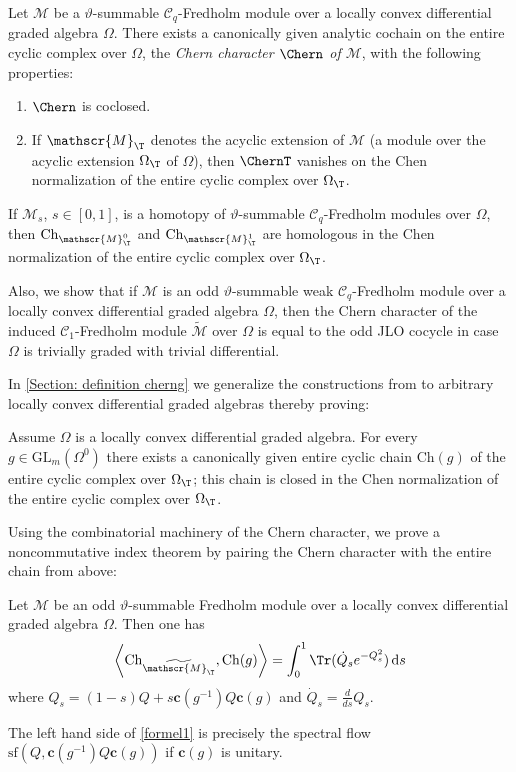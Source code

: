 \documentclass[a4paper, english, 12pt, bibliography=totocnumbered,
index=totoc]{scrartcl}
\begin{document}
\renewcommand*{\thethmALPH}{\Alph{thmALPH}}
\begin{thmALPH}
	Let $\mathscr{M}$ be a $\vartheta$-summable $\mathcal{C}_q$-Fredholm module
	over a locally convex differential graded algebra $\Omega$.
	There exists a canonically given analytic cochain on the entire cyclic
	complex over $\Omega$, the \emph{Chern character $\Chern$ of
	$\mathscr{M}$}, with the following properties:
	\begin{enumerate}
		\item $\Chern$ is coclosed.
		\item If $\mathscr{M}_\T$ denotes the acyclic extension of
		$\mathscr{M}$ (a module over the acyclic extension $\Omega_\T$ of
		$\Omega$), then $\ChernT$ vanishes on the Chen normalization of the
		entire cyclic complex over $\Omega_\T$.
	\end{enumerate}
	If $\mathscr{M}_s$, $s \in [0,1]$, is a homotopy of $\vartheta$-summable
	$\mathcal{C}_q$-Fredholm modules over $\Omega$, then
	$\mathrm{Ch}_{\mathscr{M}^0_\T}$ and
	$\mathrm{Ch}_{\mathscr{M}^1_\T}$ are homologous in the Chen normalization
	of the entire cyclic complex over $\Omega_\T$.
\end{thmALPH}
Also, we show that if $\mathscr{M}$ is an odd $\vartheta$-summable weak
$\mathcal{C}_q$-Fredholm module over a locally convex differential graded
algebra $\Omega$, then the Chern character of the induced
$\mathcal{C}_1$-Fredholm module
$\tilde{\mathscr{M}}$ over $\Omega$ is equal to the odd JLO cocycle in case
$\Omega$ is trivially graded with trivial differential.

In \cref{Section: definition cherng} we generalize the constructions from
\cite{GüneysuCacciatori} to arbitrary
locally convex differential graded algebras thereby proving:
\begin{thmALPH}
	Assume $\Omega$ is a locally convex differential graded algebra.
	For every $g \in \mathrm{GL}_m(\Omega^0)$ there exists a canonically given
	entire cyclic chain $\mathrm{Ch}(g)$ of the entire cyclic complex over
	$\Omega_\T$; this chain is closed in the Chen normalization of the entire
	cyclic complex over $\Omega_\T$.
\end{thmALPH}
Using the combinatorial machinery of the Chern character, we prove a
noncommutative index theorem by pairing the Chern character with the entire
chain from above:
\begin{thmALPH}
	Let $\mathscr{M}$ be an odd $\vartheta$-summable Fredholm
	module over a locally convex differential graded algebra $\Omega$.
	Then one has
	\begin{equation}\label{formel1}
		\left\langle \mathrm{Ch}_{\widetilde{\mathscr{M}_\T}
		},\mathrm{Ch}(g)\right\rangle =\int_0^1 \Tr(\dot{Q}_s e^{-Q_s^2}) \,
		\mathrm{d}s
	\end{equation}
	where $Q_s = (1-s) Q + s \mathbf{c}(g^{-1}) Q \mathbf{c}(g)$ and
	$\dot{Q}_s= \frac{d}{ds}Q_s$.
\end{thmALPH}
The left hand side of \cref{formel1} is precisely the spectral flow
$\mathrm{sf}(Q, \mathbf{c}(g^{-1}) Q
\mathbf{c}(g))$ if $\mathbf{c}(g)$ is unitary.
\end{document}
